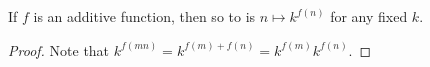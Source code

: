 \begin{theorem}
\label{powOfAdditive_isMultiplicative}
\leanok
If $f$ is an additive function, then so to is $n\mapsto k^{f(n)}$ for any fixed $k$.
\end{theorem}
\begin{proof}
\leanok
Note that $k^{f(mn)}=k^{f(m)+f(n)}=k^{f(m)}k^{f(n)}$.
\end{proof}

